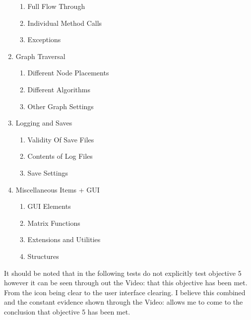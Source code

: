 \begin{flushleft}
\begin{enumerate}
\begin{enumerate}
            \item Full Flow Through
            \item Individual Method Calls
            \item Exceptions
        \end{enumerate}\bk
        \item Graph Traversal
        \begin{enumerate}
            \item Different Node Placements
            \item Different Algorithms
            \item Other Graph Settings
        \end{enumerate}\bk
        \item Logging and Saves
        \begin{enumerate}
            \item Validity Of Save Files
            \item Contents of Log Files
            \item Save Settings
        \end{enumerate}\bk
        \item Miscellaneous Items + GUI
        \begin{enumerate}
            \item GUI Elements
            \item Matrix Functions
            \item Extensions and Utilities 
            \item Structures
        \end{enumerate}
    \end{enumerate}
    \bk

    It should be noted that in the following tests do not explicitly test objective 5 however it can be seen through out the Video: that this objective has been met. From the icon being clear to the user interface clearing. I believe this combined and the constant evidence shown through the Video: allows me to come to the conclusion that objective 5 has been met.

    \bk
    \setlength\LTpre{0pt}


\end{flushleft}
